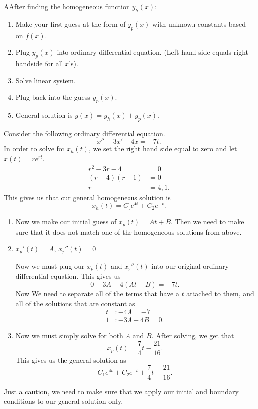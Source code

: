 \begin{theorem}
  AAfter finding the homogeneous function $y_h(x):$
  \begin{enumerate}
    \item Make your first guess at the form of $y_p(x)$ with unknown constants based on $f(x)$.
    \item Plug $y_p(x)$ into ordinary differential equation. (Left hand side equals right handside for all $x$'s).
    \item Solve linear system.
    \item Plug back into the guess $y_p(x)$.
    \item General solution is $y(x)=y_h(x)+y_p(x)$.
  \end{enumerate}
\end{theorem}

\begin{problem}
  Consider the following ordinary differential equation.
  \[
  x''-3x'-4x=-7t
  .\] 
  In order to solve for $x_h(t)$, we set the right hand side equal to zero and let $x(t)=re^{rt}$.
  \begin{align*}
    r^2-3r-4&=0\\
    (r-4)(r+1)&=0\\
    r&=4,1
  .\end{align*}
  This gives us that our general homogeneous solution is 
  \[
    x_h(t)=C_1e^{4t}+C_2e^{-t}
  .\] 
  \begin{enumerate}
    \item Now we make our initial guess of $x_p(t)=At+B$. Then we need to make sure that it does not match one of the homogeneous solutions from above.
    \item $x_p'(t)=A$, $x_p''(t)=0$
  
  Now we must plug our $x_p(t)$ and $x_p''(t)$ into our original ordinary differential equation. This gives us 
  \[
    0-3A-4(At+B)=-7t
  .\] 
  Now We need to separate all of the terms that have a $t$ attached to them, and all of the solutions that are constant as 
  \begin{align*}
    t&:-4A=-7\\
    1&:-3A-4B=0
  .\end{align*}
  \item Now we must simply solve for both $A$ and $B$. After solving, we get that 
  \[
    x_p(t)=\frac{7}{4}t-\frac{21}{16}
  .\] 
  This gives us the general solution as
  \[
  C_1e^{4t}+C_2e^{-t}+\frac{7}{4}t-\frac{21}{16}
  .\] 
  \end{enumerate}
  Just a caution, we need to make sure that we apply our initial and boundary conditions to our general solution only.
\end{problem}

